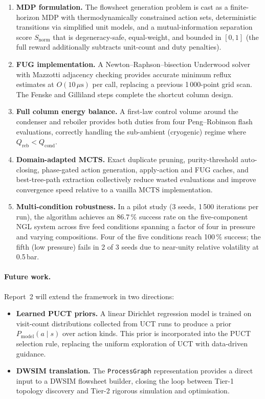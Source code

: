 \documentclass[11pt,a4paper]{article}
\theoremstyle{definition}
\theoremstyle{plain}
\newcommand{\ProcessGraph}{\texttt{ProcessGraph}}
\begin{document}
\begin{enumerate}
 \item \textbf{MDP formulation.} The flowsheet generation problem is cast as a finite-horizon MDP with thermodynamically constrained action sets, deterministic transitions via simplified unit models, and a mutual-information separation score $S_{\mathrm{norm}}$ that is degeneracy-safe, equal-weight, and bounded in $[0,1]$ (the full reward additionally subtracts unit-count and duty penalties).

 \item \textbf{FUG implementation.} A Newton--Raphson--bisection Underwood solver with Mazzotti adjacency checking provides accurate minimum reflux estimates at $O(10\,\mu\mathrm{s})$ per call, replacing a previous 1\,000-point grid scan. The Fenske and Gilliland steps complete the shortcut column design.

 \item \textbf{Full column energy balance.} A first-law control volume around the condenser and reboiler provides both duties from four Peng--Robinson flash evaluations, correctly handling the sub-ambient (cryogenic) regime where $Q_{\mathrm{reb}} < Q_{\mathrm{cond}}$.

 \item \textbf{Domain-adapted MCTS.} Exact duplicate pruning, purity-threshold auto-closing, phase-gated action generation, apply-action and FUG caches, and best-tree-path extraction collectively reduce wasted evaluations and improve convergence speed relative to a vanilla MCTS implementation.

 \item \textbf{Multi-condition robustness.} In a pilot study (3 seeds, 1\,500 iterations per run), the algorithm achieves an 86.7\,\% success rate on the five-component NGL system across five feed conditions spanning a factor of four in pressure and varying compositions. Four of the five conditions reach 100\,\% success; the fifth (low pressure) fails in 2 of 3 seeds due to near-unity relative volatility at 0.5\,bar.
\end{enumerate}

\paragraph{Future work.}
Report~2 will extend the framework in two directions:
\begin{itemize}
 \item \textbf{Learned PUCT priors.} A linear Dirichlet regression model is trained on visit-count distributions collected from UCT runs to produce a prior $P_{\mathrm{model}}(a \mid s)$ over action kinds. This prior is incorporated into the PUCT selection rule, replacing the uniform exploration of UCT with data-driven guidance.
 \item \textbf{DWSIM translation.} The \ProcessGraph{} representation provides a direct input to a DWSIM flowsheet builder, closing the loop between Tier-1 topology discovery and Tier-2 rigorous simulation and optimisation.
\end{itemize}
\end{document}
